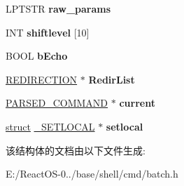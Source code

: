 \begin{DoxyCompactItemize}
L\+P\+T\+S\+TR {\bfseries raw\+\_\+params}
\item 
\mbox{\label{structtag_b_a_t_c_h_c_o_n_t_e_x_t_a4f1a125410d932f1f1b5ae4901fdc27e}} 
I\+NT {\bfseries shiftlevel} \mbox{[}10\mbox{]}
\item 
\mbox{\label{structtag_b_a_t_c_h_c_o_n_t_e_x_t_ac8345409fd3568d36077325346421fb0}} 
B\+O\+OL {\bfseries b\+Echo}
\item 
\mbox{\label{structtag_b_a_t_c_h_c_o_n_t_e_x_t_a57a1a380afd28078f4cb765cd0e654c8}} 
\hyperlink{struct___r_e_d_i_r_e_c_t_i_o_n}{R\+E\+D\+I\+R\+E\+C\+T\+I\+ON} $\ast$ {\bfseries Redir\+List}
\item 
\mbox{\label{structtag_b_a_t_c_h_c_o_n_t_e_x_t_aab88960c0d8fd49f6b6412f0b340870d}} 
\hyperlink{struct___p_a_r_s_e_d___c_o_m_m_a_n_d}{P\+A\+R\+S\+E\+D\+\_\+\+C\+O\+M\+M\+A\+ND} $\ast$ {\bfseries current}
\item 
\mbox{\label{structtag_b_a_t_c_h_c_o_n_t_e_x_t_a61ea31c10ad1c800ffbba235ca41e388}} 
\hyperlink{interfacestruct}{struct} \hyperlink{struct___s_e_t_l_o_c_a_l}{\+\_\+\+S\+E\+T\+L\+O\+C\+AL} $\ast$ {\bfseries setlocal}
\end{DoxyCompactItemize}


该结构体的文档由以下文件生成\+:\begin{DoxyCompactItemize}
\item 
E\+:/\+React\+O\+S-\/0../base/shell/cmd/batch.\+h\end{DoxyCompactItemize}
